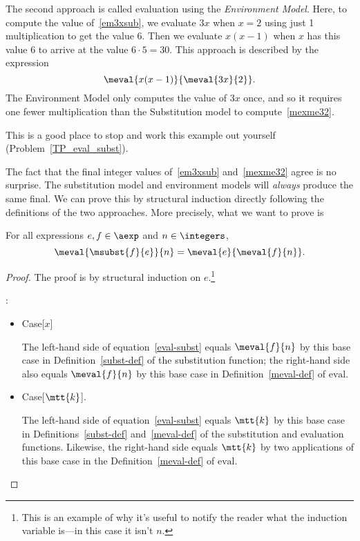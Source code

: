 \begin{definition}
The second approach is called evaluation using the \emph{Environment
  Model}.  Here, to compute the value of~\eqref{em3xsub}, we evaluate
$3x$ when $x = 2$ using just 1 multiplication to get the value 6.
Then we evaluate $x(x-1)$ when $x$ has this value 6 to arrive at the
value $6\cdot 5=30$.  This approach is described by the expression
\begin{equation}\label{mexme32}
\meval{x(x-1)}{\meval{3x}{2}}.
\end{equation}
The Environment Model only computes the value of $3x$ once, and so
it requires one fewer multiplication than the Substitution model to
compute~\eqref{mexme32}.

This is a good place to stop and work this example out yourself
(Problem~\ref{TP_eval_subst}).

The fact that the final integer values of~\eqref{em3xsub}
and~\eqref{mexme32} agree is no surprise.  The substitution model and
environment models will \emph{always} produce the same final.  We can
prove this by structural induction directly following the definitions
of the two approaches.  More precisely, what we want to prove is
\begin{theorem}\label{environments}
For all expressions $e,f \in \aexp$ and $n \in \integers$,
\begin{equation}\label{eval-subst}
\meval{\msubst{f}{e}}{n} = \meval{e}{\meval{f}{n}}.
\end{equation}
\end{theorem}

\begin{proof}
The proof is by structural induction on $e$.\footnote{This is an
  example of why it's useful to notify the reader what the induction
  variable is---in this case it isn't $n$.}

:
\begin{itemize}

\item Case[$x$]

  The left-hand side of equation~\eqref{eval-subst} equals $\meval{f}{n}$
  by this base case in Definition~\ref{subst-def} of the substitution
  function; the right-hand side also equals $\meval{f}{n}$ by this base
  case in Definition~\ref{meval-def} of $\text{eval}$.

\item Case[$\mtt{k}$].

  The left-hand side of equation~\eqref{eval-subst} equals $\mtt{k}$ by
  this base case in Definitions~\ref{subst-def} and~\ref{meval-def} of
  the substitution and evaluation functions.  Likewise, the right-hand
  side equals $\mtt{k}$ by two applications of this base case in the
  Definition~\ref{meval-def} of $\text{eval}$.


\end{itemize}
\end{proof}
\end{definition}
